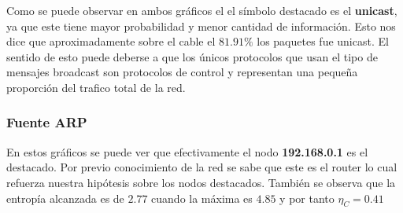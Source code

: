 Como se puede observar en ambos gráficos el el símbolo destacado es el
\textbf{unicast}, ya que este tiene mayor probabilidad y menor cantidad de
información. Esto nos dice que aproximadamente sobre el cable el $81.91\%$ los
paquetes fue unicast.  El sentido de esto puede deberse a que los únicos
protocolos que usan el tipo de mensajes broadcast son protocolos de control y
representan una pequeña proporción del trafico total de la red.

\clearpage

\subsubsection{Fuente ARP}

\begin{figure}
	\begin{minipage}[b]{0.9\linewidth}
	\end{minipage}
\end{figure}

En estos gráficos se puede ver que efectivamente el nodo \textbf{192.168.0.1}
es el destacado. Por previo conocimiento de la red se sabe que este
es el router lo cual refuerza nuestra hipótesis sobre los nodos destacados.
También se observa que la entropía alcanzada es de $2.77$ cuando la máxima
es $4.85$ y por tanto $\eta_{C} = 0.41$

